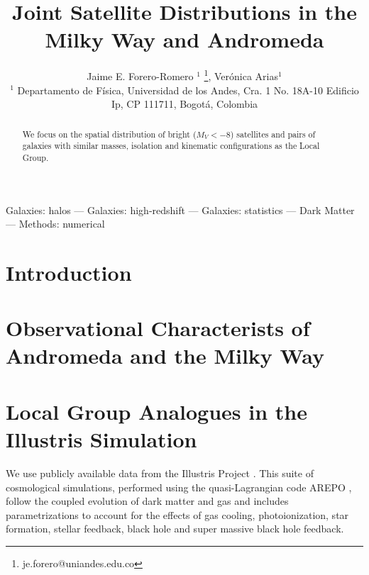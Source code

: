 \documentclass[a4paper,fleqn,usenatbib]{mnras}
\begin{document}
\title[Satellites in the MW and M31]{Joint Satellite Distributions in the Milky Way and Andromeda}
\author[J.E. Forero-Romero \& V. Arias]
{Jaime E. Forero-Romero $^{1}$ \thanks{je.forero@uniandes.edu.co},
Ver\'onica Arias$^1$\\
$^1$ Departamento de F\'isica, Universidad de los Andes, Cra. 1
  No. 18A-10 Edificio Ip, CP 111711, Bogot\'a, Colombia \\
}

\maketitle

\begin{abstract}
We focus on the spatial distribution of bright ($M_V<-8$) satellites and
pairs of galaxies with similar masses, isolation and kinematic
configurations as the Local Group. 
\end{abstract}

\begin{keywords}Galaxies: halos --- Galaxies: high-redshift --- Galaxies: statistics
--- Dark Matter --- Methods: numerical 
\end{keywords}

\section{Introduction}

\section{Observational Characterists of Andromeda and the Milky Way}
\label{sec:obs}


\section{Local Group Analogues in the Illustris Simulation}
\label{sec:NumericalSetup}

We use publicly available data from the Illustris Project 
\citep{2014MNRAS.444.1518V}. 
This suite of cosmological simulations, performed using the quasi-Lagrangian
code AREPO \citep{2010MNRAS.401..791S}, follow the coupled evolution of dark 
matter and gas and includes parametrizations to account for the effects of
gas cooling, photoionization, star formation, stellar feedback, black
hole and super massive black hole feedback. 
\end{document}
